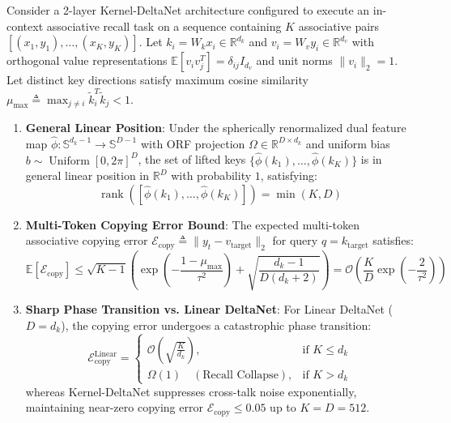 
\begin{theorem}
\label{thm:induction_head}
Consider a 2-layer Kernel-DeltaNet architecture configured to execute an in-context associative recall task on a sequence containing $K$ associative pairs $[(x_1, y_1), \dots, (x_K, y_K)]$. Let $k_i = W_k x_i \in \mathbb{R}^{d_k}$ and $v_i = W_v y_i \in \mathbb{R}^{d_v}$ with orthogonal value representations $\mathbb{E}[v_i v_j^T] = \delta_{ij} I_{d_v}$ and unit norms $\|v_i\|_2 = 1$. Let distinct key directions satisfy maximum cosine similarity $\mu_{\max} \triangleq \max_{j \neq i} \tilde{k}_i^T \tilde{k}_j < 1$.
\begin{enumerate}[label=(\roman*)]
    \item \textbf{General Linear Position}: Under the spherically renormalized dual feature map $\hat{\phi}: \mathbb{S}^{d_k-1} \to \mathbb{S}^{D-1}$ with ORF projection $\Omega \in \mathbb{R}^{D \times d_k}$ and uniform bias $b \sim \operatorname{Uniform}[0, 2\pi]^D$, the set of lifted keys $\{\hat{\phi}(k_1), \dots, \hat{\phi}(k_K)\}$ is in general linear position in $\mathbb{R}^D$ with probability $1$, satisfying:
    \begin{equation}
    \operatorname{rank}\left( [\hat{\phi}(k_1), \dots, \hat{\phi}(k_K)] \right) = \min(K, D)
    \label{eq:glp_rank}
    \end{equation}
    \item \textbf{Multi-Token Copying Error Bound}: The expected multi-token associative copying error $\mathcal{E}_{\text{copy}} \triangleq \|y_t - v_{\text{target}}\|_2$ for query $q = k_{\text{target}}$ satisfies:
    \begin{equation}
    \mathbb{E}\left[ \mathcal{E}_{\text{copy}} \right] \le \sqrt{K-1} \left( \exp\left( -\frac{1 - \mu_{\max}}{\tau^2} \right) + \sqrt{\frac{d_k - 1}{D(d_k + 2)}} \right) = \mathcal{O}\left( \frac{K}{D} \exp\left( -\frac{2}{\tau^2} \right) \right)
    \label{eq:copy_error_bound}
    \end{equation}
    \item \textbf{Sharp Phase Transition vs. Linear DeltaNet}: For Linear DeltaNet ($D = d_k$), the copying error undergoes a catastrophic phase transition:
    \begin{equation}
    \mathcal{E}_{\text{copy}}^{\text{Linear}} = \begin{cases} \mathcal{O}\left(\sqrt{\frac{K}{d_k}}\right), & \text{if } K \le d_k \\ \Omega(1) \quad (\text{Recall Collapse}), & \text{if } K > d_k \end{cases}
    \label{eq:linear_collapse}
    \end{equation}
    whereas Kernel-DeltaNet suppresses cross-talk noise exponentially, maintaining near-zero copying error $\mathcal{E}_{\text{copy}} \le 0.05$ up to $K = D = 512$.
\end{enumerate}
\end{theorem}

